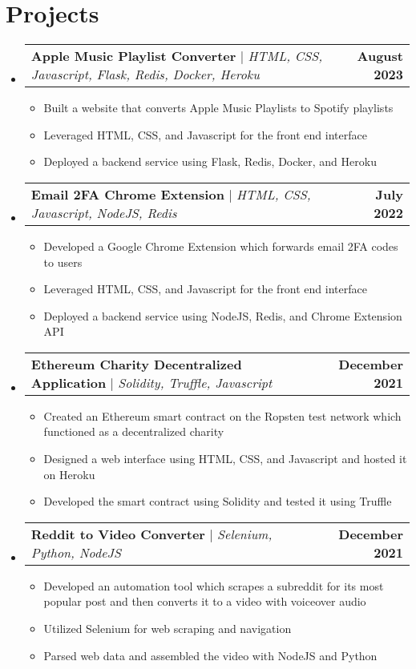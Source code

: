 \documentclass[letterpaper,11pt]{article}
\makeatletter
\newcommand{\resumeItem}[1]{
  \item\small{
    {#1 \vspace{-2pt}}
  }
}
\newcommand{\resumeProjectHeading}[2]{
    \item
    \begin{tabular*}{1.001\textwidth}{l@{\extracolsep{\fill}}r}
      \small#1 & \textbf{\small #2}\\
    \end{tabular*}\vspace{-7pt}
}
\newcommand{\resumeSubHeadingListStart}{\begin{itemize}[leftmargin=0.0in, label={}]}
\newcommand{\resumeSubHeadingListEnd}{\end{itemize}}
\newcommand{\resumeItemListStart}{\begin{itemize}}
\newcommand{\resumeItemListEnd}{\end{itemize}\vspace{-5pt}}
\makeatother
\begin{document}
\section{Projects}
    \vspace{-5pt}
    \resumeSubHeadingListStart
      \resumeProjectHeading
          {\textbf{Apple Music Playlist Converter} $|$ \emph{HTML, CSS, Javascript, Flask, Redis, Docker, Heroku}}{August 2023}
          \resumeItemListStart
            \resumeItem{Built a website that converts Apple Music Playlists to Spotify playlists}
            \resumeItem{Leveraged HTML, CSS, and Javascript for the front end interface}
            \resumeItem{Deployed a backend service using Flask, Redis, Docker, and Heroku}
          \resumeItemListEnd
          \vspace{-13pt}
      \resumeProjectHeading
          {\textbf{Email 2FA Chrome Extension} $|$ \emph{HTML, CSS, Javascript, NodeJS, Redis}}{July 2022}
          \resumeItemListStart
            \resumeItem{Developed a Google Chrome Extension which forwards email 2FA codes to users}
            \resumeItem{Leveraged HTML, CSS, and Javascript for the front end interface}
            \resumeItem{Deployed a backend service using NodeJS, Redis, and Chrome Extension API}
          \resumeItemListEnd
          \vspace{-13pt}
      \resumeProjectHeading
          {\textbf{Ethereum Charity Decentralized Application} $|$ \emph{Solidity, Truffle, Javascript}}{December 2021}
          \resumeItemListStart
            \resumeItem{Created an Ethereum smart contract on the Ropsten test network which functioned as a decentralized charity}
            \resumeItem{Designed a web interface using HTML, CSS, and Javascript and hosted it on Heroku}
            \resumeItem{Developed the smart contract using Solidity and tested it using Truffle}
          \resumeItemListEnd 
          \vspace{-13pt}
          \resumeProjectHeading
          {\textbf{Reddit to Video Converter} $|$ \emph{Selenium, Python, NodeJS}}{December 2021}
          \resumeItemListStart
            \resumeItem{Developed an automation tool which scrapes a subreddit for its most popular post and then converts it to a video with voiceover audio}
            \resumeItem{Utilized Selenium for web scraping and navigation}
            \resumeItem{Parsed web data and assembled the video with NodeJS and Python}
          \resumeItemListEnd 
    \resumeSubHeadingListEnd
\vspace{-15pt}
\end{document}
